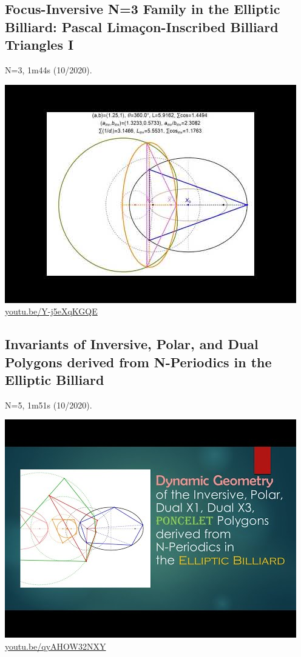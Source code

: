 \documentclass[12pt]{amsart}
\begin{document}
\subsection{Focus-Inversive N=3 Family in the Elliptic Billiard: Pascal Limaçon-Inscribed Billiard Triangles I}
\label{vid:Y-j5eXqKGQE}
\noindent N=3, 1m44s (10/2020). 
\begin{center}\includegraphics[width=.5\textwidth]{pics/Y-j5eXqKGQE.jpg} \\ 
\href{https://youtu.be/Y-j5eXqKGQE}{\url{youtu.be/Y-j5eXqKGQE}}\end{center}
% 

\subsection{Invariants of Inversive, Polar, and Dual Polygons derived from N-Periodics in the Elliptic Billiard}
\label{vid:qyAHOW32NXY}
\noindent N=5, 1m51s (10/2020). 
\begin{center}\includegraphics[width=.5\textwidth]{pics/qyAHOW32NXY.jpg} \\ 
\href{https://youtu.be/qyAHOW32NXY}{\url{youtu.be/qyAHOW32NXY}}\end{center}
% 
\end{document}
